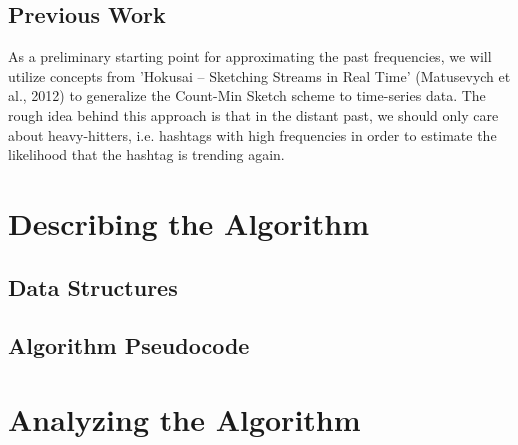 \documentclass[twoside]{article}
\begin{document}
\begin{multicols}{2}




\subsection{Previous Work}

As a preliminary starting point for approximating the past frequencies, we will utilize concepts from 'Hokusai -- Sketching Streams in Real Time' (Matusevych et al., 2012) to generalize the Count-Min Sketch scheme to time-series data. The rough idea behind this approach is that in the distant past, we should only care about heavy-hitters, i.e. hashtags with high frequencies in order to estimate the likelihood that the hashtag is trending again.



\section{Describing the Algorithm}


\lipsum[1]

\subsection{Data Structures}
\lipsum[2-3] %

\subsection{Algorithm Pseudocode} 

\lipsum[4] %


\section{Analyzing the Algorithm}


\end{multicols}
\end{document}
